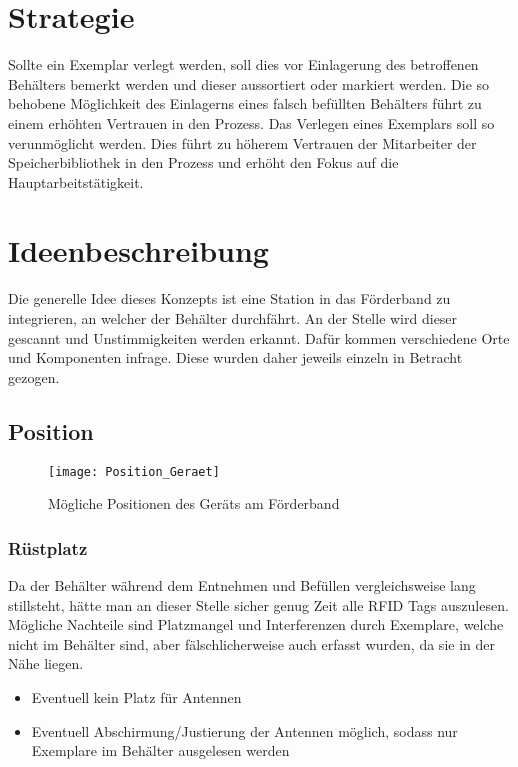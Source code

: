 \section{Strategie}
Sollte ein Exemplar verlegt werden, soll dies vor Einlagerung des betroffenen Behälters bemerkt werden und dieser aussortiert oder markiert werden. Die so behobene Möglichkeit des Einlagerns eines falsch befüllten Behälters führt zu einem erhöhten Vertrauen in den Prozess. Das Verlegen eines Exemplars soll so verunmöglicht werden. Dies führt zu höherem Vertrauen der Mitarbeiter der Speicherbibliothek in den Prozess und erhöht den Fokus auf die Hauptarbeitstätigkeit.

\section{Ideenbeschreibung}

Die generelle Idee dieses Konzepts ist eine Station in das Förderband zu integrieren, an welcher der Behälter durchfährt. An der Stelle wird dieser gescannt und Unstimmigkeiten werden erkannt. Dafür kommen verschiedene Orte und Komponenten infrage. Diese wurden daher jeweils einzeln in Betracht gezogen.

\subsection{Position}

\begin{figure}[htb]
	\centering
	\texttt{[image: Position\_Geraet]}
	\caption{Mögliche Positionen des Geräts am Förderband}
\end{figure}

\subsubsection{Rüstplatz}
Da der Behälter während dem Entnehmen und Befüllen vergleichsweise lang stillsteht, hätte man an dieser Stelle sicher genug Zeit alle RFID Tags auszulesen. Mögliche Nachteile sind Platzmangel und Interferenzen durch Exemplare, welche nicht im Behälter sind, aber fälschlicherweise auch erfasst wurden, da sie in der Nähe liegen.
\begin{itemize}
	\pro Genügend Zeit für das Auslesen aller Tags
	\pro Früh im Prozess für eine Meldung
	\con Interferenzen durch RFID markierte Exemplare in der Nähe
	\item Eventuell kein Platz für Antennen
	\item Eventuell Abschirmung/Justierung der Antennen möglich, sodass nur Exemplare im Behälter ausgelesen werden
\end{itemize}

